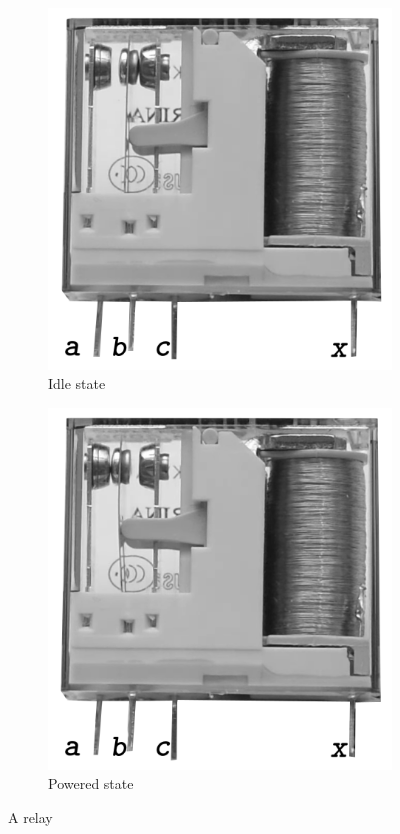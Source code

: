 \begin{figure}[t]
  \begin{subfigure}[t]{0.5\textwidth}
    \centering
    \includegraphics[scale=0.3]{images/06-07.png}
    \caption{Idle state}
    \label{relay-default}
  \end{subfigure}
  \begin{subfigure}[t]{0.5\textwidth}
    \centering
    \includegraphics[scale=0.3]{images/06-06.png}
    \caption{Powered state}
    \label{relay-powered}
  \end{subfigure}
  \caption{A relay}
  \label{relay-example}
\end{figure}


